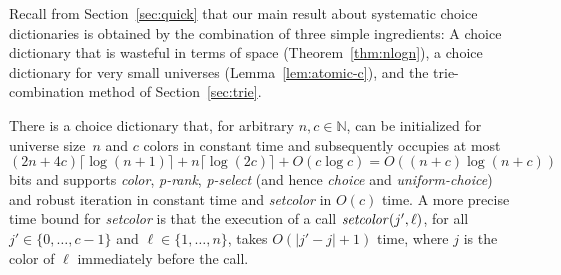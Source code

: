 \documentclass[envcountsame,envcountsect,undated,nolinenumbers]{lnthi}
\def\Tvn#1{\hbox{\textit{#1\/}}}
\def\Tceil#1{\lceil #1\rceil}
\def\TbbbN{\mathbb{N}}
\begin{document}
Recall from Section~\ref{sec:quick} that
our main result about systematic choice dictionaries
is
obtained by the combination of three simple ingredients:
A choice dictionary that is wasteful in terms
of space (Theorem~\ref{thm:nlogn}), a choice
dictionary for very small universes
(Lemma~\ref{lem:atomic-c}), and the
trie-combination method of
Section~\ref{sec:trie}.

\begin{theorem}
\label{thm:nlogn}There is a choice dictionary that,
for arbitrary $n,c\in\TbbbN$,
can be initialized for universe size~$n$
and $c$ colors in constant time
and subsequently
occupies at most
$(2 n+4 c)\Tceil{\log(n+1)}+n\Tceil{\log(2 c)}
 +O(c\log c)=O((n+c)\log(n+c))$
bits and supports \Tvn{color}, \Tvn{p-rank}, \Tvn{p-select}
(and hence \Tvn{choice} and \Tvn{uniform-choice})
and robust iteration in constant time 
and \Tvn{setcolor} in $O(c)$ time.
A more precise time bound for \Tvn{setcolor} is
that the execution of a call $\Tvn{setcolor}(j',\ell)$,
for all $j'\in\{0,\ldots,c-1\}$ and $\ell\in\{1,\ldots,n\}$,
takes $O(|j'-j|+1)$ time, where $j$ is the color of $\ell$
immediately before the call.
\end{theorem}
\end{document}
